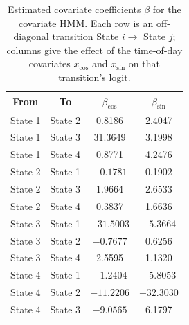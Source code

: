 \begin{table}[ht]
\centering
\begin{tabular}{cccc}
\hline
From & To & $\beta_{\cos}$ & $\beta_{\sin}$ \\
\hline
State 1 & State 2 & 0.8186 & 2.4047 \\
State 1 & State 3 & 31.3649 & 3.1998 \\
State 1 & State 4 & 0.8771 & 4.2476 \\
\hline
State 2 & State 1 & $-0.1781$ & 0.1902 \\
State 2 & State 3 & 1.9664 & 2.6533 \\
State 2 & State 4 & 0.3837 & 1.6636 \\
\hline
State 3 & State 1 & $-31.5003$ & $-5.3664$ \\
State 3 & State 2 & $-0.7677$ & 0.6256 \\
State 3 & State 4 & 2.5595 & 1.1320 \\
\hline
State 4 & State 1 & $-1.2404$ & $-5.8053$ \\
State 4 & State 2 & $-11.2206$ & $-32.3030$ \\
State 4 & State 3 & $-9.0565$ & 6.1797 \\
\hline
\end{tabular}
\caption{Estimated covariate coefficients $\beta$ for the covariate HMM. Each row is an off-diagonal transition State $i \to$ State $j$; columns give the effect of the time-of-day covariates $x_{\cos}$ and $x_{\sin}$ on that transition's logit.}
\label{tab:covariate_hmm_beta}
\end{table}
